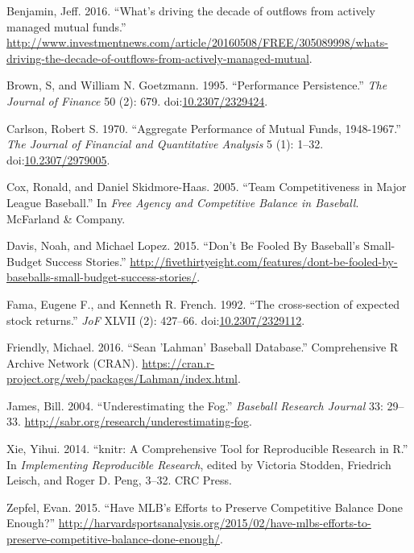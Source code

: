 \documentclass[11pt,]{scrartcl}
\begin{document}
\hypertarget{ref-Benjamin2016}{}
Benjamin, Jeff. 2016. ``What's driving the decade of outflows from
actively managed mutual funds.''
\url{http://www.investmentnews.com/article/20160508/FREE/305089998/whats-driving-the-decade-of-outflows-from-actively-managed-mutual}.

\hypertarget{ref-Brown1995}{}
Brown, S, and William N. Goetzmann. 1995. ``Performance Persistence.''
\emph{The Journal of Finance} 50 (2): 679.
doi:\href{https://doi.org/10.2307/2329424}{10.2307/2329424}.

\hypertarget{ref-Carlson1970}{}
Carlson, Robert S. 1970. ``Aggregate Performance of Mutual Funds,
1948-1967.'' \emph{The Journal of Financial and Quantitative Analysis} 5
(1): 1--32. doi:\href{https://doi.org/10.2307/2979005}{10.2307/2979005}.

\hypertarget{ref-Cox2005}{}
Cox, Ronald, and Daniel Skidmore-Haas. 2005. ``Team Competitiveness in
Major League Baseball.'' In \emph{Free Agency and Competitive Balance in
Baseball}. McFarland \& Company.

\hypertarget{ref-Davis2015}{}
Davis, Noah, and Michael Lopez. 2015. ``Don't Be Fooled By Baseball's
Small-Budget Success Stories.''
\url{http://fivethirtyeight.com/features/dont-be-fooled-by-baseballs-small-budget-success-stories/}.

\hypertarget{ref-FamaFrench1992}{}
Fama, Eugene F., and Kenneth R. French. 1992. ``The cross-section of
expected stock returns.'' \emph{JoF} XLVII (2): 427--66.
doi:\href{https://doi.org/10.2307/2329112}{10.2307/2329112}.

\hypertarget{ref-Friendly2016}{}
Friendly, Michael. 2016. ``Sean 'Lahman' Baseball Database.''
Comprehensive R Archive Network (CRAN).
\url{https://cran.r-project.org/web/packages/Lahman/index.html}.

\hypertarget{ref-James2004}{}
James, Bill. 2004. ``Underestimating the Fog.'' \emph{Baseball Research
Journal} 33: 29--33. \url{http://sabr.org/research/underestimating-fog}.

\hypertarget{ref-Xie2014}{}
Xie, Yihui. 2014. ``knitr: A Comprehensive Tool for Reproducible
Research in R.'' In \emph{Implementing Reproducible Research}, edited by
Victoria Stodden, Friedrich Leisch, and Roger D. Peng, 3--32. CRC Press.

\hypertarget{ref-Zepfel2015}{}
Zepfel, Evan. 2015. ``Have MLB's Efforts to Preserve Competitive Balance
Done Enough?''
\url{http://harvardsportsanalysis.org/2015/02/have-mlbs-efforts-to-preserve-competitive-balance-done-enough/}.

\newpage
\singlespacing 
\end{document}
